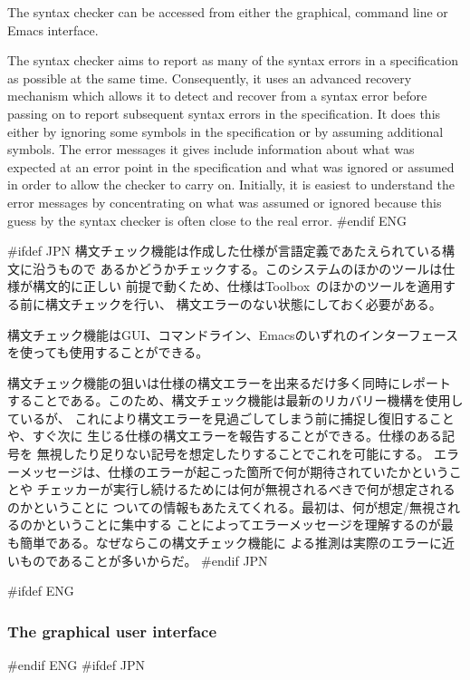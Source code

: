\documentclass[\pformat,12pt]{article}
\newcommand{\Toolbox}{Toolbox}
\newcommand{\Toolbox}{Toolbox}
\begin{document}
The syntax checker can be accessed from either the graphical, command
line or Emacs interface.

The syntax checker aims to report as many of the syntax errors in a
specification as possible at the same time. Consequently, it uses an
advanced recovery mechanism which allows it to detect and recover from
a syntax error before passing on to report subsequent syntax errors in
the specification. It does this either by ignoring some symbols in the 
specification or by assuming additional symbols. The error messages it
gives 
include information about what was expected at an error point in the
specification and what was ignored or assumed in order to allow the
checker to carry on. Initially, it is easiest to understand the error
messages by concentrating on what was assumed or ignored because this
guess by the syntax checker is often close to the real error.
#endif ENG

#ifdef JPN
構文チェック機能は作成した仕様が言語定義であたえられている構文に沿うもので
あるかどうかチェックする。このシステムのほかのツールは仕様が構文的に正しい
前提で動くため、仕様は\Toolbox\ のほかのツールを適用する前に構文チェックを行い、
構文エラーのない状態にしておく必要がある。

構文チェック機能はGUI、コマンドライン、Emacsのいずれのインターフェースを使っても使用することができる。

構文チェック機能の狙いは仕様の構文エラーを出来るだけ多く同時にレポート
することである。このため、構文チェック機能は最新のリカバリー機構を使用しているが、
これにより構文エラーを見過ごしてしまう前に捕捉し復旧することや、すぐ次に
生じる仕様の構文エラーを報告することができる。仕様のある記号を
無視したり足りない記号を想定したりすることでこれを可能にする。
エラーメッセージは、仕様のエラーが起こった箇所で何が期待されていたかということや
チェッカーが実行し続けるためには何が無視されるべきで何が想定されるのかということに
ついての情報もあたえてくれる。最初は、何が想定/無視されるのかということに集中する
ことによってエラーメッセージを理解するのが最も簡単である。なぜならこの構文チェック機能に
よる推測は実際のエラーに近いものであることが多いからだ。
#endif JPN

#ifdef ENG
\subsubsection{The graphical user interface}
#endif ENG
#ifdef JPN
\end{document}
